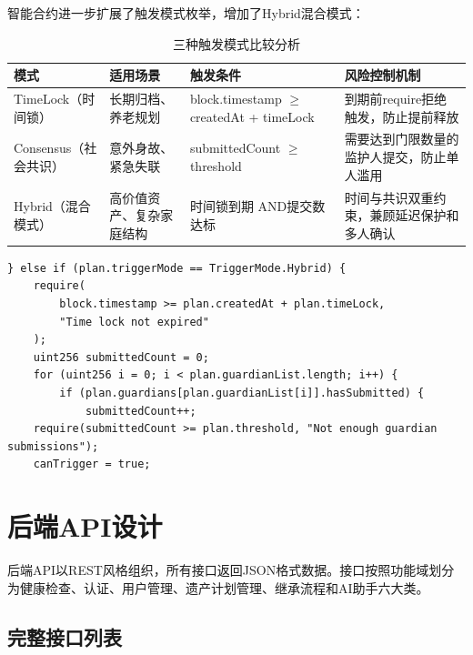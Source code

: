 \documentclass[UTF8,a4paper,zihao=-4,openany]{ctexrep}
\begin{document}
智能合约进一步扩展了触发模式枚举，增加了Hybrid混合模式：

\begin{table}[htbp]
\centering
\caption{三种触发模式比较分析}
\begin{tabularx}{\textwidth}{p{2.8cm}p{3.5cm}p{4cm}X}
\toprule
模式 & 适用场景 & 触发条件 & 风险控制机制\\
\midrule
TimeLock（时间锁） & 长期归档、养老规划 & block.timestamp $\ge$ createdAt + timeLock & 到期前require拒绝触发，防止提前释放\\
Consensus（社会共识） & 意外身故、紧急失联 & submittedCount $\ge$ threshold & 需要达到门限数量的监护人提交，防止单人滥用\\
Hybrid（混合模式） & 高价值资产、复杂家庭结构 & 时间锁到期 AND提交数达标 & 时间与共识双重约束，兼顾延迟保护和多人确认\\
\bottomrule
\end{tabularx}
\end{table}

\begin{lstlisting}[style=solidity,caption={Hybrid模式触发逻辑 (LegacyContract.sol:141-154, 节选)}]
} else if (plan.triggerMode == TriggerMode.Hybrid) {
    require(
        block.timestamp >= plan.createdAt + plan.timeLock,
        "Time lock not expired"
    );
    uint256 submittedCount = 0;
    for (uint256 i = 0; i < plan.guardianList.length; i++) {
        if (plan.guardians[plan.guardianList[i]].hasSubmitted) {
            submittedCount++;
    require(submittedCount >= plan.threshold, "Not enough guardian submissions");
    canTrigger = true;
\end{lstlisting}

\section{后端API设计}

后端API以REST风格组织，所有接口返回JSON格式数据。接口按照功能域划分为健康检查、认证、用户管理、遗产计划管理、继承流程和AI助手六大类。

\subsection{完整接口列表}
\end{document}
